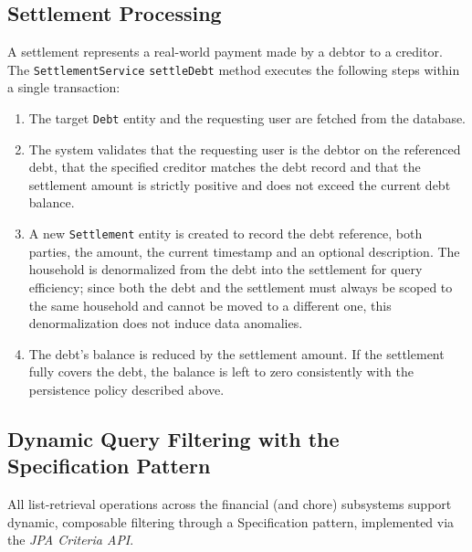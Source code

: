 \subsection{Settlement Processing}
A settlement represents a real-world payment made by a debtor to a creditor. The \texttt{SettlementService} \texttt{settleDebt} method executes the following steps within a single transaction:
\begin{enumerate}
    \item The target \texttt{Debt} entity and the requesting user are fetched from the database.
    \item The system validates that the requesting user is the debtor on the referenced debt, that the specified creditor matches the debt record and that the settlement amount is strictly positive and does not exceed the current debt balance.
    \item A new \texttt{Settlement} entity is created to record the debt reference, both parties, the amount, the current timestamp and an optional description. The household is denormalized from the debt into the settlement for query efficiency; since both the debt and the settlement must always be scoped to the same household and cannot be moved to a different one, this denormalization does not induce data anomalies.
    \item The debt's balance is reduced by the settlement amount. If the settlement fully covers the debt, the balance is left to zero consistently with the persistence policy described above.
\end{enumerate}

\subsection{Dynamic Query Filtering with the Specification Pattern}
\label{sec:pattern-specification}
All list-retrieval operations across the financial (and chore) subsystems support dynamic, composable filtering through a Specification pattern, implemented via the \textit{JPA Criteria API}.

